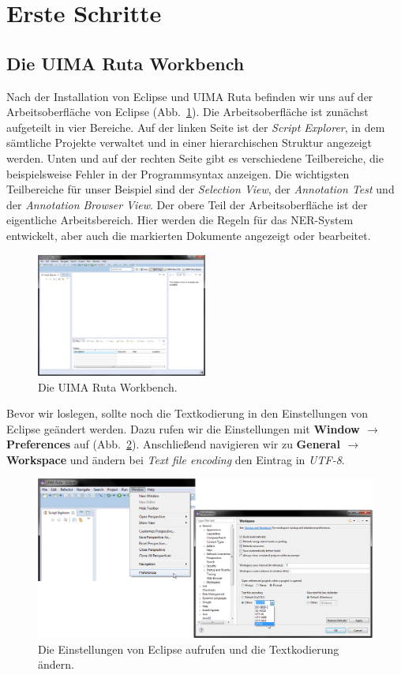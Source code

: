 \documentclass{article}
\begin{document}
\section{Erste Schritte}

\subsection{Die UIMA Ruta Workbench}
Nach der Installation von Eclipse und UIMA Ruta befinden wir uns auf der Arbeitsoberfläche von Eclipse (Abb.~\ref{workbench1}). Die Arbeitsoberfläche ist zunächst aufgeteilt in vier Bereiche. Auf der linken Seite ist der \textit{Script Explorer}, in dem sämtliche Projekte verwaltet und in einer hierarchischen Struktur angezeigt werden. Unten und auf der rechten Seite gibt es verschiedene Teilbereiche, die beispielsweise Fehler in der Programmsyntax anzeigen. Die wichtigsten Teilbereiche für unser Beispiel sind der \textit{Selection View}, der \textit{Annotation Test} und der \textit{Annotation Browser View}. Der obere Teil der Arbeitsoberfläche ist der eigentliche Arbeitsbereich. Hier werden die Regeln für das NER-System entwickelt, aber auch die markierten Dokumente angezeigt oder bearbeitet.

\begin{figure}
\centering
\includegraphics[width=0.5\textwidth]{figs/capture(1).png}
\caption{Die UIMA Ruta Workbench.}
\label{workbench1}
\end{figure}

Bevor wir loslegen, sollte noch die  Textkodierung in den Einstellungen von Eclipse geändert werden. Dazu rufen wir die Einstellungen mit \textbf{Window $\rightarrow$ Preferences} auf (Abb.~\ref{pref}). Anschließend navigieren wir zu \textbf{General $\rightarrow$ Work\-space} und ändern bei \textit{Text file encoding} den Eintrag in \textit{UTF-8}.

\begin{figure}
\centering
\includegraphics[width=1\textwidth]{figs/capture(2+3).png}
\caption{Die Einstellungen von Eclipse aufrufen und die Textkodierung ändern.}
\label{pref}
\end{figure}
\end{document}
